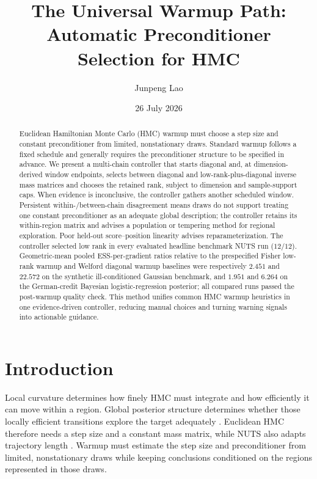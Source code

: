 \documentclass[11pt]{article}
\title{\textbf{The Universal Warmup Path:\\[2pt]
Automatic Preconditioner Selection for HMC}}
\author{Junpeng Lao}
\date{26 July 2026}
\theoremstyle{plain}
\theoremstyle{definition}
\theoremstyle{remark}
\begin{document}
\maketitle

\begin{abstract}\noindent
Euclidean Hamiltonian Monte Carlo (HMC) warmup must choose a step size and
constant preconditioner from limited, nonstationary draws. Standard warmup
follows a fixed schedule and generally requires the preconditioner structure to
be specified in advance. We present a multi-chain controller that starts
diagonal and, at dimension-derived window endpoints, selects between diagonal
and low-rank-plus-diagonal inverse mass matrices and chooses the retained rank,
subject to dimension and sample-support caps. When evidence is inconclusive,
the controller gathers another scheduled window. Persistent
within-/between-chain disagreement means draws do not support treating one
constant preconditioner as an adequate global description; the controller
retains its within-region matrix and advises a population or tempering method
for regional exploration. Poor held-out score--position linearity advises
reparameterization. The controller selected low rank in every evaluated
headline benchmark NUTS run ($12/12$).
Geometric-mean pooled ESS-per-gradient ratios relative to the prespecified
Fisher low-rank warmup and Welford diagonal warmup baselines were respectively
$2.451$ and $22.572$ on the synthetic ill-conditioned Gaussian benchmark, and
$1.951$ and $6.264$ on the German-credit Bayesian logistic-regression
posterior; all compared runs passed the post-warmup quality check.
This method unifies common HMC warmup heuristics in one evidence-driven
controller, reducing manual choices and turning warning signals into actionable
guidance.
\end{abstract}

\section{Introduction}\label{sec:intro}

Local curvature determines how finely HMC must integrate and how efficiently
it can move within a region. Global posterior structure determines whether
those locally efficient transitions explore the target adequately
\citep{duane1987hybrid,neal2011mcmc}. Euclidean HMC therefore needs a step size
and a constant mass matrix, while NUTS also adapts trajectory length
\citep{hoffman2014nuts}. Warmup must estimate the step size and preconditioner
from limited, nonstationary draws while keeping conclusions conditioned on the
regions represented in those draws.
\end{document}
